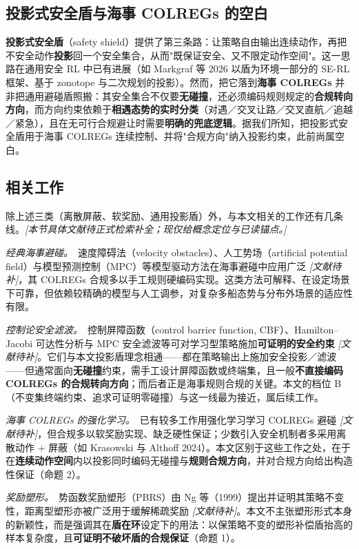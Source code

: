 \documentclass[12pt,letterpaper]{article}
\begin{document}
\subsection{投影式安全盾与海事 COLREGs 的空白}
\textbf{投影式安全盾}（safety shield）提供了第三条路：让策略自由输出连续动作，再把不安全动作\textbf{投影}回一个安全集合，从而"既保证安全、又不限定动作空间"。这一思路在通用安全 RL 中已有进展（如 Markgraf 等 2026 以盾为环境一部分的 SE-RL 框架、基于 zonotope 与二次规划的投影）。然而，把它落到\textbf{海事 COLREGs} 并非把通用避碰盾照搬：其安全集合不仅要\textbf{无碰撞}，还必须编码规则规定的\textbf{合规转向方向}，而方向约束依赖于\textbf{相遇态势的实时分类}（对遇／交叉让路／交叉直航／追越／紧急），且在无可行合规避让时需要\textbf{明确的兜底逻辑}。据我们所知，把投影式安全盾用于海事 COLREGs 连续控制、并将"合规方向"纳入投影约束，此前尚属空白。

\subsection{相关工作}
除上述三类（离散屏蔽、软奖励、通用投影盾）外，与本文相关的工作还有几条线。\textit{[本节具体文献待正式检索补全；现仅给概念定位与已读锚点。]}

\textit{经典海事避碰。}\ 速度障碍法（velocity obstacles）、人工势场（artificial potential field）与模型预测控制（MPC）等模型驱动方法在海事避碰中应用广泛 \textit{[文献待补]}，其 COLREGs 合规多以手工规则硬编码实现。这类方法可解释、在设定场景下可靠，但依赖较精确的模型与人工调参，对复杂多船态势与分布外场景的适应性有限。

\textit{控制论安全滤波。}\ 控制屏障函数（control barrier function, CBF）、Hamilton--Jacobi 可达性分析与 MPC 安全滤波等可对学习型策略施加\textbf{可证明的安全约束} \textit{[文献待补]}。它们与本文投影盾理念相通——都在策略输出上施加安全投影／滤波——但通常面向\textbf{无碰撞}约束，需手工设计屏障函数或终端集，且一般\textbf{不直接编码 COLREGs 的合规转向方向}；而后者正是海事规则合规的关键。本文的档位 B（不变集终端约束、追求可证明零碰撞）与这一线最为接近，属后续工作。

\textit{海事 COLREGs 的强化学习。}\ 已有较多工作用强化学习学习 COLREGs 避碰 \textit{[文献待补]}，但合规多以软奖励实现、缺乏硬性保证；少数引入安全机制者多采用离散动作 + 屏蔽（如 Krasowski 与 Althoff 2024）。本文区别于这些工作之处，在于在\textbf{连续动作空间}内以投影同时编码无碰撞与\textbf{规则合规方向}，并对合规方向给出构造性保证（命题 2）。

\textit{奖励塑形。}\ 势函数奖励塑形（PBRS）由 Ng 等（1999）提出并证明其策略不变性，距离型塑形亦被广泛用于缓解稀疏奖励 \textit{[文献待补]}。本文不主张塑形形式本身的新颖性，而是强调其在\textbf{盾在环}设定下的用法：以保策略不变的塑形补偿盾抬高的样本复杂度，且\textbf{可证明不破坏盾的合规保证}（命题 1）。
\end{document}
